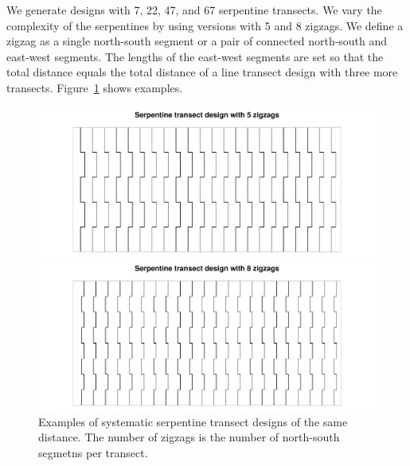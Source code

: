 \documentclass[review]{elsarticle}
\begin{document}
We generate designs with 7, 22, 47, and 67 serpentine transects. We vary the
complexity of the serpentines by using versions with 5 and 8 zigzags. We define
a zigzag as a single north-south segment or a pair of connected north-south and
east-west segments. The lengths of the east-west segments are set so that the
total distance equals the total distance of a line transect design with
three more transects. Figure~\ref{serps} shows examples.


\begin{figure}
\includegraphics[width=5in]{Serp000124.pdf}

\includegraphics[width=5in]{Serp000539.pdf}

\caption{Examples of systematic serpentine transect designs of the same
distance. The number of zigzags is the number of north-south segmetns per
transect.}
\label{serps}
\end{figure}
\end{document}
